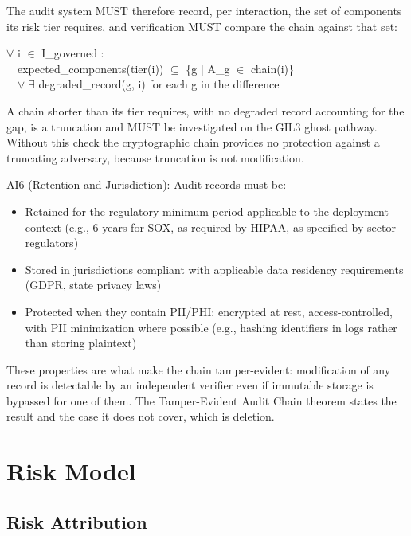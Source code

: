 \begin{cdef}
The audit system MUST therefore record, per interaction, the set of components its risk tier requires, and verification MUST compare the chain against that set:

\begin{claddisp}
$\forall$ i $\in$ I\_governed :\\
~~expected\_components(tier(i)) $\subseteq$ \{g | A\_g $\in$ chain(i)\}\\
~~$\vee$ $\exists$ degraded\_record(g, i) for each g in the difference\\
\end{claddisp}
A chain shorter than its tier requires, with no degraded record accounting for the gap, is a truncation and MUST be investigated on the GIL3 ghost pathway. Without this check the cryptographic chain provides no protection against a truncating adversary, because truncation is not modification.

AI6 (Retention and Jurisdiction): Audit records must be:
\begin{itemize}
  \item Retained for the regulatory minimum period applicable to the deployment context (e.g., 6 years for SOX, as required by HIPAA, as specified by sector regulators)
  \item Stored in jurisdictions compliant with applicable data residency requirements (GDPR, state privacy laws)
  \item Protected when they contain PII/PHI: encrypted at rest, access-controlled, with PII minimization where possible (e.g., hashing identifiers in logs rather than storing plaintext)
\end{itemize}

\end{cdef}


These properties are what make the chain tamper-evident: modification of any
record is detectable by an independent verifier even if immutable storage is
bypassed for one of them. The Tamper-Evident Audit Chain theorem states the result
and the case it does not cover, which is deletion.




\section{Risk Model}
\label{sec:framework-10}


\subsection{Risk Attribution}


